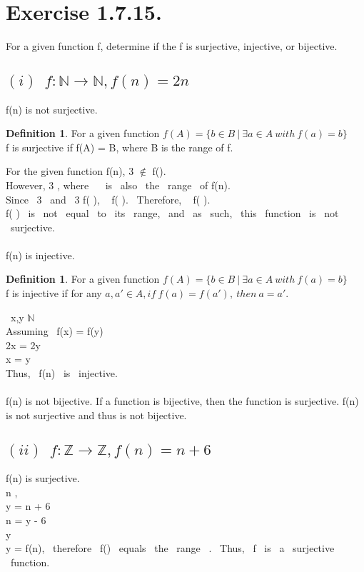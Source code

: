 \documentclass[12pt]{article}
\theoremstyle{definition}
\newtheorem{definition}[theorem]{Definition}
\numberwithin{equation}{subsection}
\begin{document}
\section{Exercise 1.7.15.}
For a given function f, determine if the f is surjective, injective, or bijective.

\subsection*{$(i) \enspace f: \mathbb{N} \to \mathbb{N} , f(n) = 2n $}
f(n) is not surjective.
\begin{definition}
For a given function $f(A) = \{ b \in B \ | \ \exists a \in A \ with \ f(a) = b \} $
\\ f is surjective if f(A) = B, where B is the range of f.
\end{definition}
For the given function f(n), 3 $\notin$ f().
\\However, 3 \in {}, where \  \ is \ also \ the \ range \ of f(n).
\\Since \ 3 \in {} \ and \ 3 \notin f(  ), \  \nsubseteq f(  ). \ Therefore, \  \neq f(  ).
\\f(  ) \ is \ not \ equal \ to \ its \ range, \ and \ as \ such, \ this \ function \ is \ not \ surjective. \\ \\

f(n) is injective.
\begin{definition}
For a given function $f(A) = \{ b \in B \ | \ \exists a \in A \ with \ f(a) = b \} $
\\ f is injective if for any $a,a' \in A, if \ f(a) = f(a'), \ then \ a = a'$.
\end{definition}
\exists \ x,y \in $\mathbb{N}$
\\ Assuming \ f(x) = f(y)
\\ 2x = 2y
\\ x = y
\\Thus, \ f(n) \ is \ injective. \\ \\

f(n) is not bijective. If a function is bijective, then the function is surjective. f(n) is not surjective and thus is not bijective.

\subsection*{$(ii) \enspace f: \mathbb{Z} \to \mathbb{Z} , f(n) = n + 6 $}
f(n) is surjective.
\\ n \in {},
\\ y = n + 6
\\ n = y - 6
\\ y \in {}
\\ y = f(n), \ therefore \ f() \ equals \ the \ range \ . \ Thus, \ f \ is \ a \ surjective \ function. \\ \\
\end{document}
